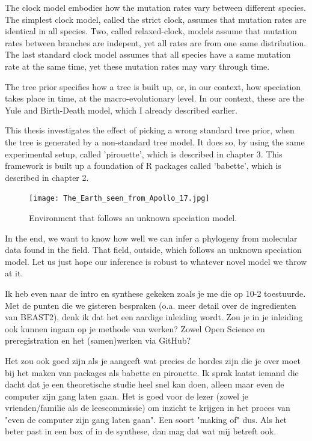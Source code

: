 The clock model embodies how the mutation rates vary between
different species. The simplest clock model, called the strict clock,
assumes that mutation rates are identical in all species. 
Two, called relaxed-clock, models assume that mutation rates
between branches are indepent, yet all rates are from one same distribution.
The last standard clock model assumes that all species have a same mutation
rate at the same time, yet these mutation rates may vary through time.

The tree prior specifies how a tree is built up, or, in our context,
how speciation takes place in time, at the macro-evolutionary level.
In our context, these are the Yule and Birth-Death model, which I already
described earlier.

This thesis investigates the effect of picking a wrong standard
tree prior, when the tree is generated 
by a non-standard tree model. 
It does so, by using the same experimental setup, called 'pirouette',
which is described in chapter 3. This framework is built up a foundation
of R packages called 'babette', which is described in chapter 2.

\begin{figure}[H]
  \texttt{[image: The\_Earth\_seen\_from\_Apollo\_17.jpg]}
  \caption{
    Environment that follows an unknown speciation model.
 }
  \label{fig:unknown_speciation_model}
\end{figure}

In the end, we want to know how well we can infer a phylogeny from
molecular data found in the field. That field, outside, 
which follows an unknown speciation model. Let us just hope our inference
is robust to whatever novel model we throw at it.





Ik heb even naar de intro en synthese gekeken zoals je me die op 10-2 toestuurde. 
Met de punten die we gisteren bespraken (o.a. meer detail over de ingredienten 
van BEAST2), denk ik dat het een aardige inleiding wordt. Zou je in je inleiding 
ook kunnen ingaan op je methode van werken? 
Zowel Open Science en preregistration en het (samen)werken via GitHub? 

Het zou ook goed zijn als je aangeeft wat precies de hordes zijn die je over 
moet bij het maken van packages als babette en pirouette. 
Ik sprak laatst iemand die dacht dat je een theoretische studie heel snel kan doen, 
alleen maar even de computer zijn gang laten gaan. 
Het is goed voor de lezer (zowel je vrienden/familie als de leescommissie) 
om inzicht te krijgen in het proces van "even de computer zijn gang laten gaan". 
Een soort "making of" dus. Als het beter past in een box of in de synthese, 
dan mag dat wat mij betreft ook.

